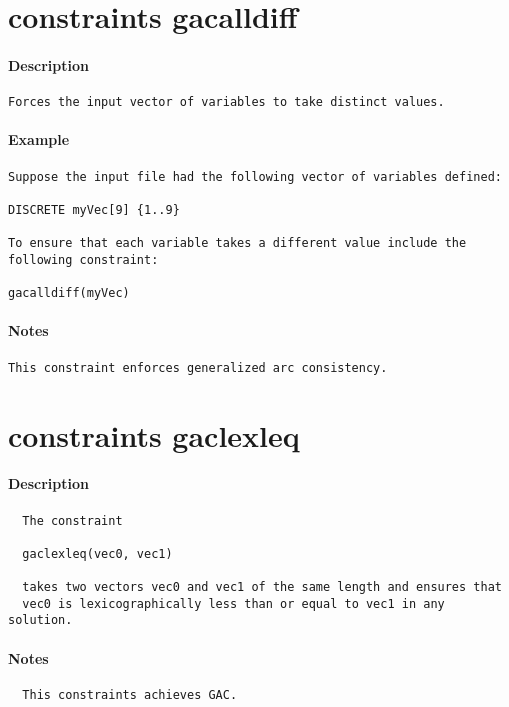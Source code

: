 \section{constraints gacalldiff}
\paragraph{Description}
{\footnotesize
\begin{verbatim}
Forces the input vector of variables to take distinct values.
\end{verbatim}
}
\paragraph{Example}
{\footnotesize
\begin{verbatim}
Suppose the input file had the following vector of variables defined:

DISCRETE myVec[9] {1..9}

To ensure that each variable takes a different value include the
following constraint:

gacalldiff(myVec)
\end{verbatim}
}
\paragraph{Notes}
{\footnotesize
\begin{verbatim}
This constraint enforces generalized arc consistency.
\end{verbatim}
}
\section{constraints gaclexleq}
\paragraph{Description}
{\footnotesize
\begin{verbatim}
  The constraint

  gaclexleq(vec0, vec1)

  takes two vectors vec0 and vec1 of the same length and ensures that
  vec0 is lexicographically less than or equal to vec1 in any solution.
\end{verbatim}
}
\paragraph{Notes}
{\footnotesize
\begin{verbatim}
  This constraints achieves GAC.
\end{verbatim}
}
